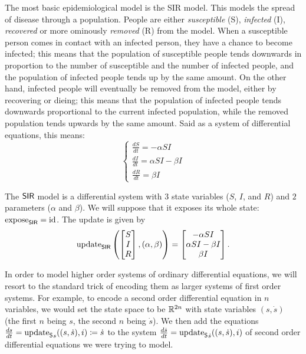 \documentclass[DynamicalBook]{subfiles}
\begin{document}
\begin{example}\label{ex.sir_model_diff}
  The most basic epidemiological model is the SIR model. This models the spread
  of disease through a population. People are either \emph{susceptible} (S),
  \emph{infected} (I), \emph{recovered} or more ominously \emph{removed} (R)
  from the model. When a susceptible person comes in contact with an infected
  person, they have a chance to become infected; this means that the population
  of susceptible people tends downwards in proportion to the number of
  susceptible and the number of infected people, and the population of infected
  people tends up by the same amount. On the other hand, infected people will
  eventually be removed from the model, either by recovering or dieing; this
  means that the population of infected people tends downwards proportional to
  the current infected population, while the removed population tends upwards by
  the same amount. Said as a system of differential equations, this means:
  \begin{equation}\label{eqn.sir_model_diff}
    \begin{cases}
      \frac{dS}{dt} = -\alpha S I \\
      \frac{dI}{dt} = \alpha S I - \beta I \\
      \frac{dR}{dt} = \beta I
    \end{cases}
  \end{equation}

  The $\mathsf{SIR}$ model is a differential system with $3$ state variables ($S$,
  $I$, and $R$) and $2$ parameters ($\alpha$ and $\beta$). We will suppose that
  it exposes its whole state: $\mathrm{expose}_{\mathsf{SIR}} = \mathrm{id}$. The update is given by 
\[
\mathrm{update}_{\mathsf{SIR}}\left( \begin{bmatrix} S\\ I \\ R \end{bmatrix}, (\alpha, \beta)
\right) = \begin{bmatrix} -\alpha S I \\ \alpha S I - \beta I \\ \beta I\end{bmatrix}.
\]
\end{example}


  In order to model higher order systems of ordinary differential equations, we will resort
  to the standard trick of encoding them as larger systems of first order
  systems. For example, to encode a second order differential equation in $n$
  variables, we would set the state space to be $\mathbb{R}^{2n}$ with state variables
  $(s, \dot{s})$ (the first $n$ being $s$, the second $n$ being $\dot{s}$). We
  then add the equations $\frac{ds}{dt} = {\mathrm{update}_{\mathsf{S}}}_{s}((s, \dot{s}), i) \coloneqq \dot{s}$ to the system
  $\frac{d\dot{s}}{dt} = {\mathrm{update}_{\mathsf{S}}}_{\dot{s}}((s, \dot{s}), i)$ of second order
  differential equations we were trying to model.
  
\end{document}
